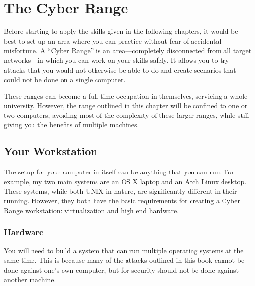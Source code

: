 \chapter{The Cyber Range}
	Before starting to apply the skills given in the following chapters, it would be best to set up an area where you can practice without fear of accidental misfortune\cite{pentestingLabs}.
	A ``Cyber Range'' is an area---completely disconnected from all target networks---in which you can work on your skills safely.  
	It allows you to try attacks that you would not otherwise be able to do and create scenarios that could not be done on a single computer. 
	
	These ranges can become a full time occupation in themselves, servicing a whole university. 
	However, the range outlined in this chapter will be confined to one or two computers, avoiding most of the complexity of these larger ranges, 
	while still giving you the benefits of multiple machines. 
	\section{Your Workstation}
		The setup for your computer in itself can be anything that you can run. 
		For example, my two main systems are an OS X laptop and an Arch Linux desktop. 
		These systems, while both UNIX in nature, are significantly different in their running. 
		However, they both have the basic requirements for creating a Cyber Range workstation: virtualization and high end hardware. 

		\subsection{Hardware}
			You will need to build a system that can run multiple operating systems at the same time. 
			This is because many of the attacks outlined in this book cannot be done against one's own computer, 
			but for security should not be done against another machine. 

